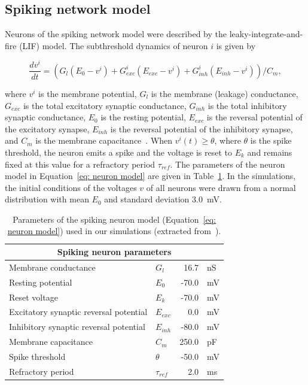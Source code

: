 \subsection*{Spiking network model}

Neurons of the spiking network model were described by the leaky-integrate-and-fire (LIF) model. The subthreshold dynamics of neuron $i$ is given by

\begin{equation}
\label{eq: neuron model}
\frac{dv^i}{dt} = \left ( G_l \left ( E_0-v^i \right ) + G_{exc}^i\left ( E_{exc} - v^i \right ) + G_{inh}^i\left ( E_{inh} - v^i \right ) \right )/C_m,
\end{equation}

where $v^i$ is the membrane potential, $G_l$ is the membrane (leakage) conductance, $G_{exc}$ is the total excitatory synaptic conductance, $G_{inh}$ is the total inhibitory synaptic conductance, $E_0$ is the resting potential, $E_{exc}$ is the reversal potential of the excitatory synapse, $E_{inh}$ is the reversal potential of the inhibitory synapse, and $C_m$ is the membrane capacitance~\cite{kumar2008high}. When $v^i(t)\geq \theta$, where $\theta$ is the spike threshold, the neuron emits a spike and the voltage is reset to $E_k$ and remains fixed at this value for a refractory period $\tau_{ref}$. The parameters of the neuron model in Equation~\ref{eq: neuron model} are given in Table~\ref{tab: neuron model}. In the simulations, the initial conditions of the voltages $v$ of all neurons were drawn from a normal distribution with mean $E_0$ and standard deviation 3.0~mV.  

\begin{table}[!h]
\caption{Parameters of the spiking neuron model (Equation~\ref{eq: neuron model}) used in our simulations (extracted from~\cite{kumar2008high}).}
\centering
\begin{tabular}{llr@{~}l}
\hline
\multicolumn{4}{c}{Spiking neuron parameters}                   \\ \hline
Membrane conductance          & $G_l$        & 16.7 & nS  \\
Resting potential             & $E_0$        & -70.0 & mV \\
Reset voltage                 & $E_k$        & -70.0 & mV \\
Excitatory synaptic reversal potential & $E_{exc}$    & 0.0 & mV   \\
Inhibitory synaptic reversal potential & $E_{inh}$    & -80.0 & mV \\
Membrane capacitance          & $C_m$        & 250.0 & pF \\
Spike threshold             & $\theta$        & -50.0 & mV \\
Refractory period             & $\tau_{ref}$ & 2.0 & ms   \\ \hline
\end{tabular}
\label{tab: neuron model}
\end{table}

